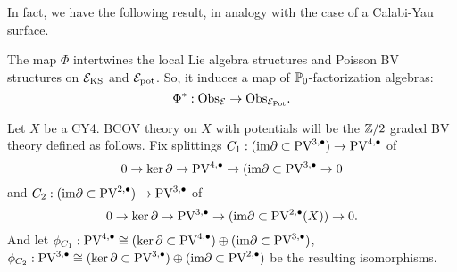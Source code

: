 \documentclass[11pt]{article}
\begin{document}
In fact, we have the following result, in analogy with the case of a Calabi-Yau surface.

\begin{prop}
The map $\Phi$ intertwines the local Lie algebra structures and Poisson BV structures on $\mathcal{E}_{\rm KS}$ and $\mathcal{E}_{\rm pot}$. 
So, it induces a map of $\mathbb{P}_0$-factorization algebras:
\[
\Phi^* : {\rm Obs}_{\mathcal{E}} \to {\rm Obs}_{\mathcal{E}_{\rm Pot}} .
\]
\end{prop} 

\iffalse
Let \(X\) be a CY4. BCOV theory on \(X\) with potentials will be the \(\mathbb{Z}/2\) graded BV theory defined as follows. Fix splittings \(C_1: (\text{im}\partial\subset\text{PV}^{3,\bullet})\to \text{PV}^{4,\bullet}\) of  \[0\to\ker\partial\to \text{PV}^{4,\bullet}\to(\text{im}\partial\subset\text{PV}^{3,\bullet}\to 0\] and \(C_2: (\text{im}\partial\subset\text{PV}^{2,\bullet})\to\text{PV}^{3,\bullet}\) of \[0\to\ker\partial\to\text{PV}^{3,\bullet}\to(\text{im}\partial\subset\text{PV}^{2,\bullet}(X))\to 0.\] And let \(\phi_{C_1} : \text{PV}^{4,\bullet}\cong(\ker\partial\subset\text{PV}^{4,\bullet})\oplus(\text{im}\partial\subset\text{PV}^{3,\bullet})\), \(\phi_{C_2}: \text{PV}^{3,\bullet}\cong(\ker\partial\subset\text{PV}^{3,\bullet})\oplus(\text{im}\partial\subset\text{PV}^{2,\bullet})\) be the resulting isomorphisms.
\end{document}
